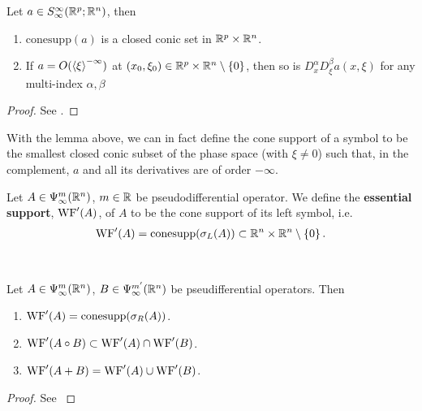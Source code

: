 \documentclass[12pt]{article}
\begin{document}
\begin{flemma}
    Let $a \in S^{\infty}_\infty(\R^{p}; \R^n)$, then 
    \begin{enumerate}
        \item $\mathrm{conesupp}(a)$ is a closed conic set in $\R^p \times \R^n$. 
        \item If $a = O(\sym[\xi]^{-\infty})$ at $(x_0, \xi_0) \in \R^p \times \R^n \setminus \set{0}$, then so is $D^\alpha_x D^\beta_\xi a(x, \xi)$ for any multi-index $\alpha, \beta$
    \end{enumerate}
\end{flemma}
\begin{proof}
    See \cite[Chapter 4]{rbm_intro_microlocal}.
\end{proof}

With the lemma above, we can in fact define the cone support of a symbol to be the smallest closed conic subset of the phase space (with $\xi \neq 0$) such that, in the complement, $a$ and all its derivatives are of order $-\infty$.\\



\begin{fdefinition}
    Let $A \in \Psi^m_\infty(\R^n)$,  $m \in \R$ be pseudodifferential operator. We define the \textbf{essential support}, $\WF'(A)$, of $A$ to be the cone support of its left symbol, i.e. 
    \begin{align*}
        \WF'(A) = \mathrm{conesupp}(\sigma_L(A)) \subset \R^n \times \R^n \setminus \set{0}. 
    \end{align*}
\end{fdefinition}
\hfill \\

\begin{flemma}
    Let $A \in \Psi^m_\infty(\R^n)$, $B \in \Psi^{m'}_\infty(\R^n)$ be pseudifferential operators. Then 
    \begin{enumerate}
        \item $\WF'(A) = \mathrm{conesupp}(\sigma_R(A))$. 
        \item $\WF'(A\circ B) \subset \WF'(A) \cap \WF'(B)$. 
        \item $\WF'(A + B) = \WF'(A) \cup \WF'(B)$. 
    \end{enumerate}
\end{flemma}
\begin{proof}
    See \cite[Section 3]{Vasy2015-oo}
\end{proof}
\end{document}
